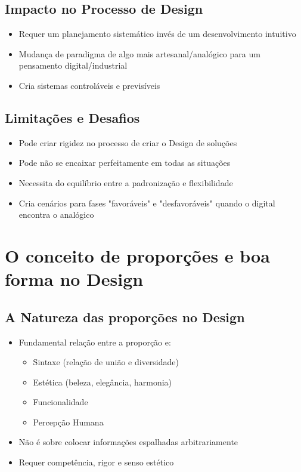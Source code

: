 \documentclass{article}
\begin{document}
\subsection{Impacto no Processo de Design}
\begin{itemize}
    \item Requer um planejamento sistemático invés de um desenvolvimento intuitivo
    \item Mudança de paradigma de algo mais artesanal/analógico para um pensamento digital/industrial
    \item Cria sistemas controláveis e previsíveis
\end{itemize}
\subsection{Limitações e Desafios}
\begin{itemize}
    \item Pode criar rigidez no processo de criar o Design de soluções
    \item Pode não se encaixar perfeitamente em todas as situações
    \item Necessita do equilíbrio entre a padronização e flexibilidade
    \item Cria cenários para fases "favoráveis" e "desfavoráveis" quando o digital encontra o analógico
\end{itemize}

\section{O conceito de proporções e boa forma no Design}
\subsection{A Natureza das proporções no Design}
\begin{itemize}
    \item Fundamental relação entre a proporção e:
    \begin{itemize}
        \item Sintaxe (relação de união e diversidade)
        \item Estética (beleza, elegância, harmonia)
        \item Funcionalidade
        \item Percepção Humana
    \end{itemize}
    \item Não é sobre colocar informações espalhadas arbitrariamente
    \item Requer competência, rigor e senso estético
\end{itemize}
\end{document}
